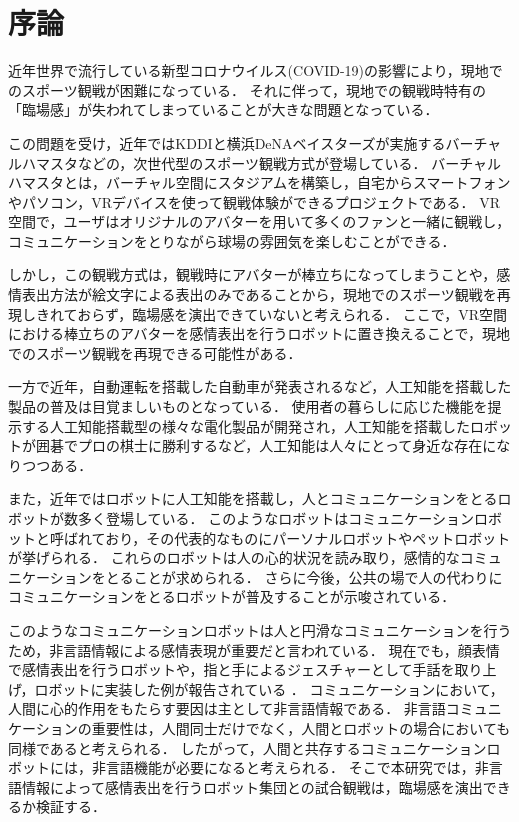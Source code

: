 \chapter{序論}
\thispagestyle{fancy}
\lhead{}
\chead{}
\rhead{}
\lfoot{} 
\cfoot{\thepage}  
\rfoot{}
\setcounter{page}{1}

近年世界で流行している新型コロナウイルス(COVID-19)の影響により，現地でのスポーツ観戦が困難になっている．
それに伴って，現地での観戦時特有の「臨場感」が失われてしまっていることが大きな問題となっている．

この問題を受け，近年ではKDDIと横浜DeNAベイスターズが実施するバーチャルハマスタなどの，次世代型のスポーツ観戦方式が登場している\cite{hamasuta}．
バーチャルハマスタとは，バーチャル空間にスタジアムを構築し，自宅からスマートフォンやパソコン，VRデバイスを使って観戦体験ができるプロジェクトである．
VR空間で，ユーザはオリジナルのアバターを用いて多くのファンと一緒に観戦し，コミュニケーションをとりながら球場の雰囲気を楽しむことができる．

しかし，この観戦方式は，観戦時にアバターが棒立ちになってしまうことや，感情表出方法が絵文字による表出のみであることから，現地でのスポーツ観戦を再現しきれておらず，臨場感を演出できていないと考えられる．
ここで，VR空間における棒立ちのアバターを感情表出を行うロボットに置き換えることで，現地でのスポーツ観戦を再現できる可能性がある．

一方で近年，自動運転を搭載した自動車が発表されるなど，人工知能を搭載した製品の普及は目覚ましいものとなっている．
使用者の暮らしに応じた機能を提示する人工知能搭載型の様々な電化製品が開発され，人工知能を搭載したロボットが囲碁でプロの棋士に勝利するなど，人工知能は人々にとって身近な存在になりつつある\cite{healsio}\cite{go}．

また，近年ではロボットに人工知能を搭載し，人とコミュニケーションをとるロボットが数多く登場している．
このようなロボットはコミュニケーションロボットと呼ばれており，その代表的なものにパーソナルロボットやペットロボットが挙げられる\cite{toyota}\cite{aibo}．
これらのロボットは人の心的状況を読み取り，感情的なコミュニケーションをとることが求められる．
さらに今後，公共の場で人の代わりにコミュニケーションをとるロボットが普及することが示唆されている\cite{deep}．

このようなコミュニケーションロボットは人と円滑なコミュニケーションを行うため，非言語情報による感情表現が重要だと言われている．
現在でも，顔表情で感情表出を行うロボットや，指と手によるジェスチャーとして手話を取り上げ，ロボットに実装した例が報告されている
\cite{kao}\cite{syuwa}．
コミュニケーションにおいて，人間に心的作用をもたらす要因は主として非言語情報である\cite{higengo}．
非言語コミュニケーションの重要性は，人間同士だけでなく，人間とロボットの場合においても同様であると考えられる．
したがって，人間と共存するコミュニケーションロボットには，非言語機能が必要になると考えられる．
そこで本研究では，非言語情報によって感情表出を行うロボット集団との試合観戦は，臨場感を演出できるか検証する．

